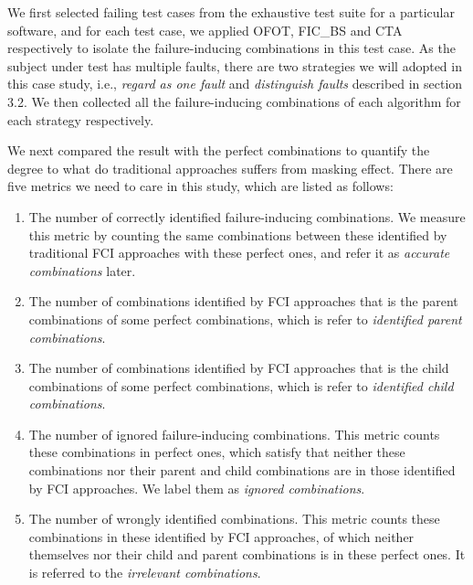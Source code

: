 \documentclass{sig-alternate}
\begin{document}

We first selected failing test cases from the exhaustive test suite for a particular software, and for each test case, we applied OFOT, FIC\_BS and CTA respectively to isolate the failure-inducing combinations in this test case.  As the subject under test has multiple faults, there are two strategies we will adopted in this case study, i.e., \emph{regard as one fault} and \emph{distinguish faults} described in section 3.2. We then collected all the failure-inducing combinations of each algorithm for each strategy respectively.
%
%

We next compared the result with the perfect combinations to quantify the degree to what do traditional approaches suffers from masking effect. There are five metrics we need to care in this study, which are listed as follows:
 \begin{enumerate}
 \item The number of correctly identified failure-inducing combinations. We measure this metric by counting the same combinations between these identified by traditional FCI approaches with these perfect ones, and refer it as \emph{accurate combinations} later.
 \item The number of combinations identified by FCI approaches that is the parent combinations of some perfect combinations, which is refer to \emph{identified parent combinations}.
 \item The number of combinations  identified by FCI approaches that is the child combinations of some perfect combinations, which is refer to \emph{identified child combinations}.

 \item The number of ignored failure-inducing combinations. This metric counts these combinations in perfect ones, which satisfy that neither these combinations nor their parent and child combinations are in those identified by FCI approaches. We label them as \emph{ignored combinations}.
 \item The number of wrongly identified combinations. This metric counts these combinations in these identified by FCI approaches, of which neither themselves nor their child and parent combinations is in these perfect ones. It is referred to the \emph{irrelevant combinations}.

\end{enumerate}
\end{document}
